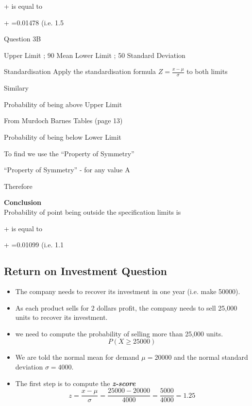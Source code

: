 ﻿\documentclass[]{report}
\begin{document}
+ is equal to


+ =0.01478  	(i.e. 1.5%

Question 3B

Upper Limit ; 90		Mean		 	
Lower Limit ; 50		Standard Deviation	 

Standardisation
Apply the standardisation formula $Z=\frac{x-\mu}{\sigma} $ to both limits


Similary



Probability of being above Upper Limit

From Murdoch Barnes Tables (page 13)  

Probability of being below Lower Limit


To find   we use the “Property of Symmetry”

“Property of Symmetry” -   for any value A

Therefore 

\noindent \textbf{Conclusion}\\
Probability of point being outside the specification limits is

+ is equal to

+ =0.01099  	(i.e. 1.1%











\subsection*{Return on Investment Question}

\begin{itemize}
	\item The company needs to recover its investment in one year (i.e. make 50000).
	\item As each product sells for 2 dollars profit, the company needs to sell 25,000 units to recover its investment.
	\item we need to compute the probability of selling more than 25,000 units.
	\[P(X \geq 25000) \]
	\item We are told the normal mean for demand $\mu =20000$ and the normal standard deviation $\sigma = 4000$.
	\item The first step is to compute the \textbf{\textit{z-score}}
	\[ z = \frac{x - \mu}{\sigma}  = \frac{25000 - 20000}{4000} = \frac{5000}{4000} = 1.25\]
\end{itemize}
\end{document}

